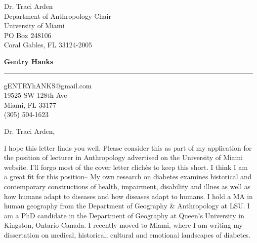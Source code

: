 \documentclass[10pt]{letter} %
\begin{document}
\begin{letter}{Dr. Traci Arden \\
Department of Anthropology Chair \\
University of Miami \\
PO Box 248106 \\
Coral Gables, FL 33124-2005}


\begin{flushright}
\large\bf Gentry Hanks \\ %
\vspace{15pt} \hrule height 1pt %
gENTRYhANKS@gmail.com \\
19525 SW 128th Ave \\ 
Miami, FL 33177 \\ 
(305) 504-1623 \\%
\end{flushright} 

\signature{Gentry Hanks} %


\opening{Dr. Traci Arden,} 

I hope this letter finds you well. Please consider this as part of my application for the position of lecturer in Anthropology advertised on the University of Miami website. I'll forgo most of the cover letter  clich\`{e}s to keep this short. I think I am a great fit for this position-- My own research on diabetes examines historical and contemporary constructions of health, impairment, disability and illnes as well as how humans adapt to diseases and how diseases adapt to humans. I hold a MA in human geography from the Department of Geography \& Anthropology at LSU. I am a PhD candidate in the Department of Geography at Queen's University in Kingston, Ontario Canada. I recently moved to Miami, where I am writing my dissertation on medical, historical, cultural and emotional landscapes of diabetes.


\end{letter}
\end{document}
